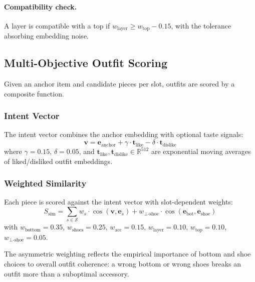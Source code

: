 \documentclass[10pt,twocolumn]{article}
\begin{document}
\paragraph{Compatibility check.}
A layer is compatible with a top if $w_{\text{layer}} \geq
w_{\text{top}} - 0.15$, with the tolerance absorbing embedding noise.

\subsection{Multi-Objective Outfit Scoring}
\label{sec:scoring}

Given an anchor item and candidate pieces per slot, outfits are scored by a
composite function.

\subsubsection{Intent Vector}

The intent vector combines the anchor embedding with optional taste signals:
\begin{equation}
  \mathbf{v} = \mathbf{e}_{\text{anchor}} + \gamma \cdot
    \mathbf{t}_{\text{like}} - \delta \cdot \mathbf{t}_{\text{dislike}}
\label{eq:intent}
\end{equation}
where $\gamma = 0.15$, $\delta = 0.05$, and
$\mathbf{t}_{\text{like}}, \mathbf{t}_{\text{dislike}} \in \mathbb{R}^{512}$
are exponential moving averages of liked/disliked outfit embeddings.

\subsubsection{Weighted Similarity}

Each piece is scored against the intent vector with slot-dependent weights:
\begin{equation}
  S_{\text{sim}} = \sum_{s \in \mathcal{S}} w_s \cdot
    \cos(\mathbf{v}, \mathbf{e}_s) + w_{\bot\text{-shoe}} \cdot
    \cos(\mathbf{e}_{\text{bot}}, \mathbf{e}_{\text{shoe}})
\label{eq:sim}
\end{equation}
with $w_{\text{bottom}} = 0.35$, $w_{\text{shoes}} = 0.25$,
$w_{\text{acc}} = 0.15$, $w_{\text{layer}} = 0.10$,
$w_{\text{top}} = 0.10$, $w_{\bot\text{-shoe}} = 0.05$.

The asymmetric weighting reflects the empirical importance of bottom and shoe
choices to overall outfit coherence: a wrong bottom or wrong shoes breaks
an outfit more than a suboptimal accessory.
\end{document}
